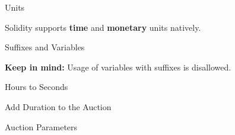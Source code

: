 \documentclass[handout]{beamer}
\begin{document}
\begin{frame}{Units}

Solidity supports \textbf{time} and \textbf{monetary} units natively.

\vspace{0.5 em}


\vspace{1.5em}


\end{frame}

\begin{frame}{Suffixes and Variables}

\textbf{Keep in mind:} Usage of variables with suffixes is disallowed.

\vspace{1.5em}
\begin{samplecode}{Hours to Seconds}
	
\end{samplecode}

\end{frame}


\begin{frame}{Add Duration to the Auction}

\begin{samplecode}{Auction Parameters}
	
\end{samplecode} 
	
\end{frame}
\end{document}
